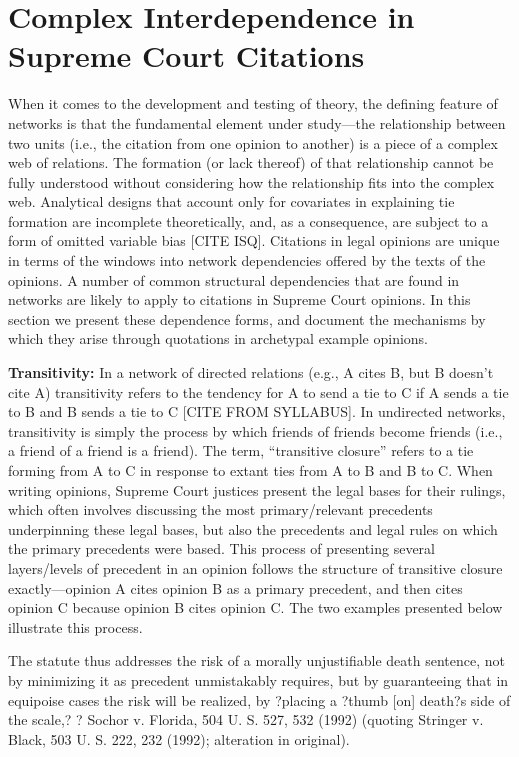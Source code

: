 \documentclass[headsepline=true, abstracton]{scrartcl}
\begin{document}
\section{Complex Interdependence in Supreme Court Citations}

When it comes to the development and testing of theory, the defining feature of networks is that the fundamental element under study---the relationship between two units (i.e., the citation from one opinion to another) is a piece of a complex web of relations. The formation (or lack thereof) of that relationship cannot be fully understood without considering how the relationship fits into the complex web. Analytical designs that account only for covariates in explaining tie formation are incomplete theoretically, and, as a consequence, are subject to a form of omitted variable bias [CITE ISQ]. Citations in legal opinions are unique in terms of the windows into network dependencies offered by the texts of the opinions. A number of common structural dependencies that are found in networks are likely to apply to citations in Supreme Court opinions. In this section we present these dependence forms, and document the mechanisms by which they arise through quotations in archetypal example opinions. 

\textbf{Transitivity:} In a network of directed relations (e.g., A cites B, but B doesn't cite A) transitivity refers to the tendency for A to send a tie to C if A sends a tie to B and B sends a tie to C [CITE FROM SYLLABUS]. In undirected networks, transitivity is simply the process by which friends of friends become friends (i.e., a friend of a friend is a friend). The term, ``transitive closure'' refers to a tie forming from A to C in response to extant ties from A to B and B to C. When writing opinions, Supreme Court justices present the legal bases for their rulings, which often involves discussing the most primary/relevant precedents underpinning these legal bases, but also the precedents and legal rules on which the primary precedents were based. This process of presenting several layers/levels of precedent in an opinion follows the structure of transitive closure exactly---opinion A cites opinion B as a primary precedent, and then cites opinion C because opinion B cites opinion C. The two examples presented below illustrate this process.

The statute thus addresses the risk of a morally unjustifiable death sentence, not by minimizing it as precedent unmistakably requires, but by guaranteeing that in equipoise cases the risk will be realized, by ?placing a ?thumb [on] death?s side of the scale,? ? Sochor v. Florida, 504 U. S. 527, 532 (1992) (quoting Stringer v. Black, 503 U. S. 222, 232 (1992); alteration in original).
\end{document}
